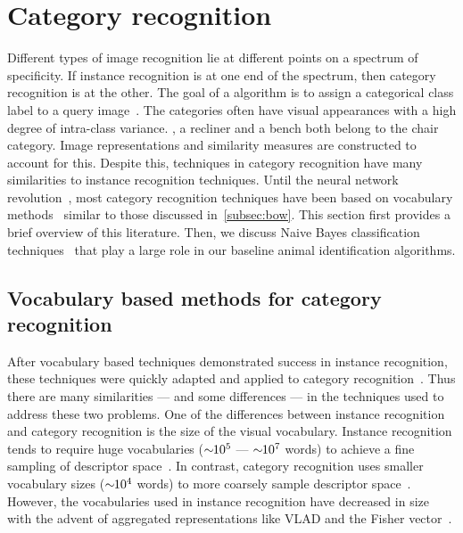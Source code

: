 \section{Category recognition}\label{sec:cr}  

    Different types of image recognition lie at different points on a spectrum of specificity.
    If instance recognition is at one end of the spectrum, then category recognition is at the other.
    The goal of a  algorithm is to assign a categorical class label to a query
      image~\cite{everingham_pascal_2010, everingham_pascal_2015, russakovsky_imagenet_2014, deng_imagenet_2009,
      fei_fei_one_shot_2006, griffin_caltech_256_2007}.
    The categories often have visual appearances with a high degree of intra-class variance.
    \Eg{}, a recliner and a bench both belong to the chair category.
    Image representations and similarity measures are constructed to account for this.
    Despite this, techniques in category recognition have many similarities to instance recognition techniques.
    Until the neural network revolution~\cite{krizhevsky_imagenet_2012}, most category recognition techniques
      have been based on vocabulary methods~\cite{csurka_visual_2004, yang_linear_2009, sanchez_compressed_2013,
      russakovsky_imagenet_2014, krizhevsky_imagenet_2012} similar to those discussed in~\cref{subsec:bow}.
    This section first provides a brief overview of this literature.
    Then, we discuss Naive Bayes classification techniques~\cite{boiman_defense_2008,mccann_local_2012} that play
      a large role in our baseline animal identification algorithms.

    \subsection{Vocabulary based methods for category recognition}
        After vocabulary based techniques demonstrated success in instance recognition, these techniques were
          quickly adapted and applied to category recognition~\cite{csurka_visual_2004}.
        Thus there are many similarities --- and some differences --- in the techniques used to address these two
          problems.
        One of the differences between instance recognition and category recognition is the size of the visual
          vocabulary.
        Instance recognition tends to require huge vocabularies ($\sim\mkern-6mu 10^{5}$ --- $\sim\mkern-6mu 10^{7}$ words)
          to achieve a fine sampling of descriptor space~\cite{nister_scalable_2006, philbin_object_2007}.
        In contrast, category recognition uses smaller vocabulary sizes
        ($\sim\mkern-6mu 10^{4}$ words) to more coarsely sample descriptor space~\cite{zhang_local_2006}.
        However, the vocabularies used in instance recognition have decreased in size with the advent of
          aggregated representations like VLAD and the Fisher vector~\cite{arandjelovic_all_2013,
          sanchez_compressed_2013}.

